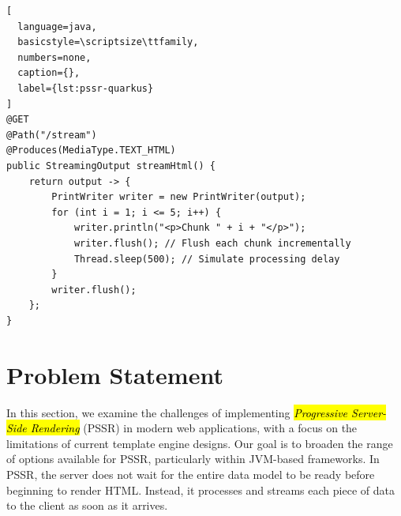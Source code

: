 \documentclass[software,article,accept,pdftex,moreauthors]{Definitions/mdpi}
\begin{document}
\vspace{-3pt}
\begin{listing}[H]
\caption{Progressive Server-Side Rendering in Quarkus using StreamingOutput.}
\begin{lstlisting}[
  language=java,
  basicstyle=\scriptsize\ttfamily,
  numbers=none,
  caption={},
  label={lst:pssr-quarkus}
]
@GET
@Path("/stream")
@Produces(MediaType.TEXT_HTML)
public StreamingOutput streamHtml() {
    return output -> {
        PrintWriter writer = new PrintWriter(output);
        for (int i = 1; i <= 5; i++) {
            writer.println("<p>Chunk " + i + "</p>");
            writer.flush(); // Flush each chunk incrementally
            Thread.sleep(500); // Simulate processing delay
        }
        writer.flush();
    };
}
\end{lstlisting}
\end{listing}


\section{Problem Statement}\label{s3}

In this section, we examine the challenges of implementing \textit{\hl{Progressive
Server-Side Rendering}} (PSSR) in modern web applications, with a focus on the
limitations of current template engine designs. Our goal is to broaden the
range of options available for PSSR, particularly within JVM-based frameworks.
In PSSR, the server does not
wait for the entire data model to be ready before beginning to render HTML.
Instead, it processes and streams each piece of data to the client as soon as
it arrives. 
\end{document}
